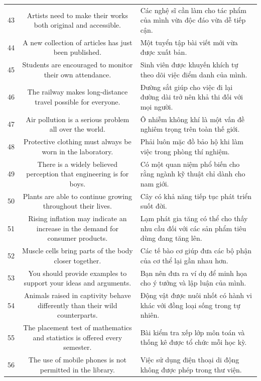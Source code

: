 \documentclass[11pt,a4paper]{article}
\begin{document}
\begin{longtable}{N S M}
43 & Artists need to make their works both original and accessible. & Các nghệ sĩ cần làm cho tác phẩm của mình vừa độc đáo vừa dễ tiếp cận. \\
44 & A new collection of articles has just been published. & Một tuyển tập bài viết mới vừa được xuất bản. \\
45 & Students are encouraged to monitor their own attendance. & Sinh viên được khuyến khích tự theo dõi việc điểm danh của mình. \\
46 & The railway makes long-distance travel possible for everyone. & Đường sắt giúp cho việc đi lại đường dài trở nên khả thi đối với mọi người. \\
47 & Air pollution is a serious problem all over the world. & Ô nhiễm không khí là một vấn đề nghiêm trọng trên toàn thế giới. \\
48 & Protective clothing must always be worn in the laboratory. & Phải luôn mặc đồ bảo hộ khi làm việc trong phòng thí nghiệm. \\
49 & There is a widely believed perception that engineering is for boys. & Có một quan niệm phổ biến cho rằng ngành kỹ thuật chỉ dành cho nam giới. \\
50 & Plants are able to continue growing throughout their lives. & Cây có khả năng tiếp tục phát triển suốt đời. \\
51 & Rising inflation may indicate an increase in the demand for consumer products. & Lạm phát gia tăng có thể cho thấy nhu cầu đối với các sản phẩm tiêu dùng đang tăng lên. \\
52 & Muscle cells bring parts of the body closer together. & Các tế bào cơ giúp đưa các bộ phận của cơ thể lại gần nhau hơn. \\
53 & You should provide examples to support your ideas and arguments. & Bạn nên đưa ra ví dụ để minh họa cho ý tưởng và lập luận của mình. \\
54 & Animals raised in captivity behave differently than their wild counterparts. & Động vật được nuôi nhốt có hành vi khác với đồng loại sống trong tự nhiên. \\
55 & The placement test of mathematics and statistics is offered every semester. & Bài kiểm tra xếp lớp môn toán và thống kê được tổ chức mỗi học kỳ. \\
56 & The use of mobile phones is not permitted in the library. & Việc sử dụng điện thoại di động không được phép trong thư viện. \\

\end{longtable}
\end{document}
